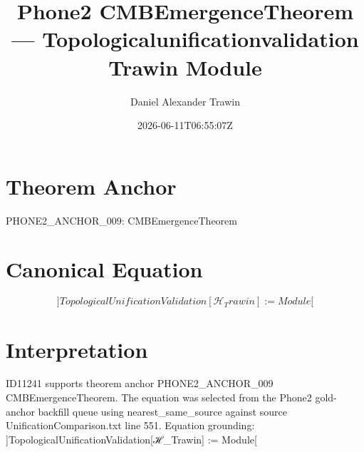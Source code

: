 \documentclass[11pt]{article}
\title{Phone2 CMBEmergenceTheorem — Topologicalunificationvalidation Trawin Module}
\author{Daniel Alexander Trawin}
\date{2026-06-11T06:55:07Z}
\begin{document}
\maketitle
\section*{Theorem Anchor}
PHONE2_ANCHOR_009: CMBEmergenceTheorem
\section*{Canonical Equation}
\[
]TopologicalUnificationValidation[ℋ_Trawin] := Module[
\]
\section*{Interpretation}
ID11241 supports theorem anchor PHONE2_ANCHOR_009 CMBEmergenceTheorem. The equation was selected from the Phone2 gold-anchor backfill queue using nearest_same_source against source UnificationComparison.txt line 551. Equation grounding: ]TopologicalUnificationValidation[ℋ_Trawin] := Module[
\end{document}

